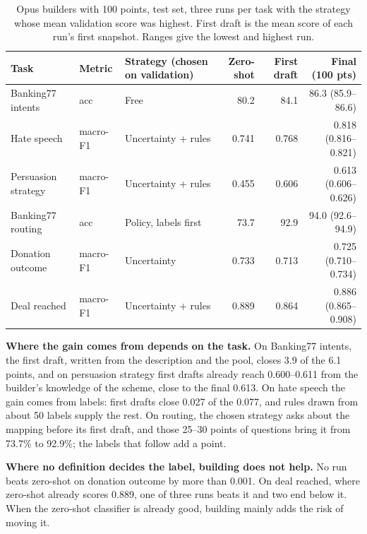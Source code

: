 \documentclass[11pt]{article}
\begin{document}
\begin{table}[t]
\centering\small\setlength{\tabcolsep}{3.5pt}
\begin{tabularx}{\textwidth}{lLLRRR}
\toprule
Task & Metric & Strategy (chosen on validation) & Zero-shot & First draft & Final (100 pts) \\
\midrule
Banking77 intents & acc & Free & 80.2 & 84.1 & 86.3 (85.9--86.6) \\
Hate speech & macro-F1 & Uncertainty + rules & 0.741 & 0.768 & 0.818 (0.816--0.821) \\
Persuasion strategy & macro-F1 & Uncertainty + rules & 0.455 & 0.606 & 0.613 (0.606--0.626) \\
Banking77 routing & acc & Policy, labels first & 73.7 & 92.9 & 94.0 (92.6--94.9) \\
Donation outcome & macro-F1 & Uncertainty & 0.733 & 0.713 & 0.725 (0.710--0.734) \\
Deal reached & macro-F1 & Uncertainty + rules & 0.889 & 0.864 & 0.886 (0.865--0.908) \\
\bottomrule
\end{tabularx}
\caption{Opus builders with 100 points, test set, three runs per task with the strategy whose mean validation score was highest. First draft is the mean score of each run's first snapshot. Ranges give the lowest and highest run.}
\label{tab:4}
\end{table}

\textbf{Where the gain comes from depends on the task.} On Banking77 intents, the first draft, written from the description and the pool, closes 3.9 of the 6.1 points, and on persuasion strategy first drafts already reach 0.600--0.611 from the builder's knowledge of the scheme, close to the final 0.613. On hate speech the gain comes from labels: first drafts close 0.027 of the 0.077, and rules drawn from about 50 labels supply the rest. On routing, the chosen strategy asks about the mapping before its first draft, and those 25--30 points of questions bring it from 73.7\% to 92.9\%; the labels that follow add a point.

\textbf{Where no definition decides the label, building does not help.} No run beats zero-shot on donation outcome by more than 0.001. On deal reached, where zero-shot already scores 0.889, one of three runs beats it and two end below it. When the zero-shot classifier is already good, building mainly adds the risk of moving it.
\end{document}

